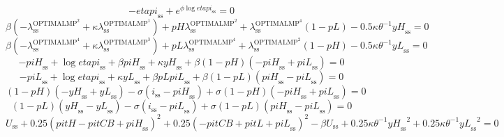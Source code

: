 \begin{equation}
-{e\!t\!a\!p\!i}_\mathrm{ss} + e^{{\phi} {\log{{e\!t\!a\!p\!i}_\mathrm{ss}}}} = 0
\end{equation}
\begin{equation}
{\beta} \left(-\lambda^{\mathrm{OPTIMALMP}^{\mathrm{2}}}_\mathrm{ss} + {\kappa} {\lambda^{\mathrm{OPTIMALMP}^{\mathrm{1}}}_\mathrm{ss}}\right) + {{p\!H}} {\lambda^{\mathrm{OPTIMALMP}^{\mathrm{2}}}_\mathrm{ss}} + {\lambda^{\mathrm{OPTIMALMP}^{\mathrm{4}}}_\mathrm{ss}} \left(1 - {p\!L}\right) - 0.5{\kappa} {\theta}^{-1} {{y\!H}_\mathrm{ss}} = 0
\end{equation}
\begin{equation}
{\beta} \left(-\lambda^{\mathrm{OPTIMALMP}^{\mathrm{4}}}_\mathrm{ss} + {\kappa} {\lambda^{\mathrm{OPTIMALMP}^{\mathrm{3}}}_\mathrm{ss}}\right) + {{p\!L}} {\lambda^{\mathrm{OPTIMALMP}^{\mathrm{4}}}_\mathrm{ss}} + {\lambda^{\mathrm{OPTIMALMP}^{\mathrm{2}}}_\mathrm{ss}} \left(1 - {p\!H}\right) - 0.5{\kappa} {\theta}^{-1} {{y\!L}_\mathrm{ss}} = 0
\end{equation}
\begin{equation}
-{p\!i\!H}_\mathrm{ss} + \log{{e\!t\!a\!p\!i}_\mathrm{ss}} + {\beta} {{p\!i\!H}_\mathrm{ss}} + {\kappa} {{y\!H}_\mathrm{ss}} + {\beta} \left(1 - {p\!H}\right) \left(-{p\!i\!H}_\mathrm{ss} + {p\!i\!L}_\mathrm{ss}\right) = 0
\end{equation}
\begin{equation}
-{p\!i\!L}_\mathrm{ss} + \log{{e\!t\!a\!p\!i}_\mathrm{ss}} + {\kappa} {{y\!L}_\mathrm{ss}} + {\beta} {{p\!L}} {{p\!i\!L}_\mathrm{ss}} + {\beta} \left(1 - {p\!L}\right) \left({p\!i\!H}_\mathrm{ss} - {p\!i\!L}_\mathrm{ss}\right) = 0
\end{equation}
\begin{equation}
\left(1 - {p\!H}\right) \left(-{y\!H}_\mathrm{ss} + {y\!L}_\mathrm{ss}\right) - {\sigma} \left(i_\mathrm{ss} - {p\!i\!H}_\mathrm{ss}\right) + {\sigma} \left(1 - {p\!H}\right) \left(-{p\!i\!H}_\mathrm{ss} + {p\!i\!L}_\mathrm{ss}\right) = 0
\end{equation}
\begin{equation}
\left(1 - {p\!L}\right) \left({y\!H}_\mathrm{ss} - {y\!L}_\mathrm{ss}\right) - {\sigma} \left(i_\mathrm{ss} - {p\!i\!L}_\mathrm{ss}\right) + {\sigma} \left(1 - {p\!L}\right) \left({p\!i\!H}_\mathrm{ss} - {p\!i\!L}_\mathrm{ss}\right) = 0
\end{equation}
\begin{equation}
U_\mathrm{ss} + 0.25\left({p\!i\!t\!H} - {p\!i\!t\!C\!B} + {p\!i\!H}_\mathrm{ss}\right)^{2} + 0.25\left(-{p\!i\!t\!C\!B} + {p\!i\!t\!L} + {p\!i\!L}_\mathrm{ss}\right)^{2} - {\beta} {U_\mathrm{ss}} + 0.25{\kappa} {\theta}^{-1} {{y\!H}_\mathrm{ss}}^{2} + 0.25{\kappa} {\theta}^{-1} {{y\!L}_\mathrm{ss}}^{2} = 0
\end{equation}
